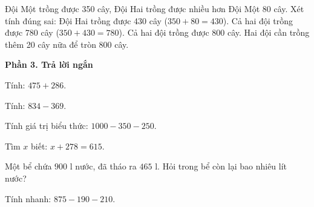 \begin{ex} %
Đội Một trồng được 350 cây, Đội Hai trồng được nhiều hơn Đội Một 80 cây. Xét tính đúng sai:
\choiceTF
{\True Đội Hai trồng được 430 cây ($350 + 80 = 430$).}
{\True Cả hai đội trồng được 780 cây ($350 + 430 = 780$).}
{Cả hai đội trồng được 800 cây.}
{\True Hai đội cần trồng thêm 20 cây nữa để tròn 800 cây.}
\end{ex}

\textbf{Phần 3. Trả lời ngắn}

\begin{ex} %
Tính: $475 + 286$.
\end{ex}

\begin{ex} %
Tính: $834 - 369$.
\end{ex}

\begin{ex} %
Tính giá trị biểu thức: $1000 - 350 - 250$.
\end{ex}

\begin{ex} %
Tìm $x$ biết: $x + 278 = 615$.
\end{ex}

\begin{ex} %
Một bể chứa $900\text{ l}$ nước, đã tháo ra $465\text{ l}$. Hỏi trong bể còn lại bao nhiêu lít nước?
\end{ex}

\begin{ex} %
Tính nhanh: $875 - 190 - 210$.
\end{ex}
